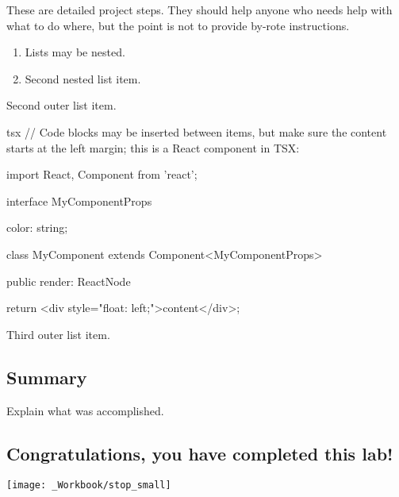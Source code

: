 \documentclass[../workbook]{subfiles}
\begin{document}
\begin{numbers}
    \item These are detailed project steps. They should help anyone who needs help with what to do where, but the point is not to provide by-rote instructions.
        \begin{enumerate}
            \item Lists may be nested.
            \item Second nested list item.
        \end{enumerate}
    \item Second outer list item.
    \begin{codeblock}{tsx}
// Code blocks may be inserted between items, but make sure the content starts at the left margin; this is a React component in TSX:

import React, { Component } from 'react';

interface MyComponentProps {

    color: string;
}

class MyComponent extends Component<MyComponentProps> {

    public render: ReactNode {

        return <div style="float: left;">content</div>;
    }
}
    \end{codeblock}%
    \item Third outer list item.
\end{numbers}



\subsection*{Summary}

\par{
    Explain what was accomplished.
}


\subsection*{\textbf{Congratulations, you have completed this lab!}}
\texttt{[image: \_Workbook/stop\_small]}
\end{document}
